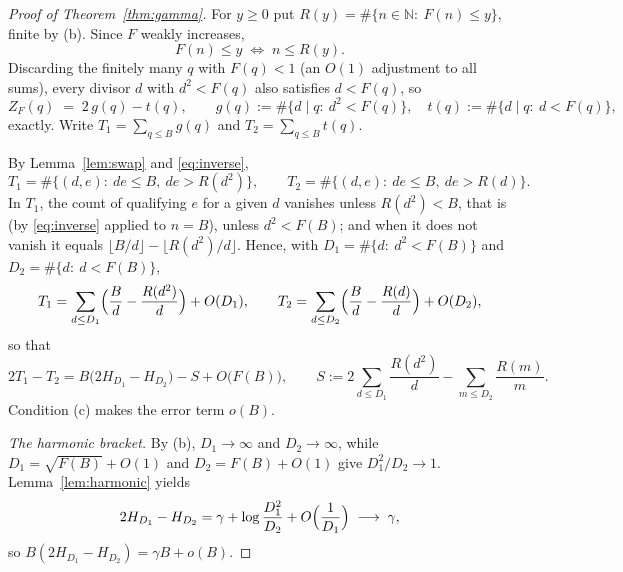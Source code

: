 \documentclass[11pt]{amsart}
\theoremstyle{remark}
\newcommand{\N}{\mathbb{N}}
\newcommand{\eul}{\gamma}
\begin{document}
\begin{proof}[Proof of Theorem~\ref{thm:gamma}]
For $y\ge0$ put $R(y)=\#\{n\in\N:\ F(n)\le y\}$, finite by (b).  Since
$F$ weakly increases,
\begin{equation}\label{eq:inverse}
F(n)\le y\;\iff\;n\le R(y).
\end{equation}
Discarding the finitely many $q$ with $F(q)<1$ (an $O(1)$ adjustment to
all sums), every divisor $d$ with $d^{2}<F(q)$ also satisfies
$d<F(q)$, so
\[
Z_{F}(q)\;=\;2\,g(q)-t(q),
\qquad
g(q):=\#\{d\mid q:\ d^{2}<F(q)\},
\quad
t(q):=\#\{d\mid q:\ d<F(q)\},
\]
exactly.  Write $T_{1}=\sum_{q\le B}g(q)$ and
$T_{2}=\sum_{q\le B}t(q)$.

By Lemma~\ref{lem:swap} and \eqref{eq:inverse},
\[
T_{1}=\#\{(d,e):\ de\le B,\ de>R(d^{2})\},
\qquad
T_{2}=\#\{(d,e):\ de\le B,\ de>R(d)\}.
\]
In $T_{1}$, the count of qualifying $e$ for a given $d$ vanishes unless
$R(d^{2})<B$, that is (by \eqref{eq:inverse} applied to $n=B$), unless
$d^{2}<F(B)$; and when it does not vanish it equals
$\lfloor B/d\rfloor-\lfloor R(d^{2})/d\rfloor$.  Hence, with
$D_{1}=\#\{d:\ d^{2}<F(B)\}$ and $D_{2}=\#\{d:\ d<F(B)\}$,
\[
T_{1}=\sum_{d\le D_{1}}\Bigl(\frac{B}{d}-\frac{R(d^{2})}{d}\Bigr)
+O(D_{1}),
\qquad
T_{2}=\sum_{d\le D_{2}}\Bigl(\frac{B}{d}-\frac{R(d)}{d}\Bigr)
+O(D_{2}),
\]
so that
\begin{equation}\label{eq:master}
2T_{1}-T_{2}
=B\bigl(2H_{D_{1}}-H_{D_{2}}\bigr)-S+O\bigl(F(B)\bigr),
\qquad
S:=2\sum_{d\le D_{1}}\frac{R(d^{2})}{d}
-\sum_{m\le D_{2}}\frac{R(m)}{m}.
\end{equation}
Condition (c) makes the error term $o(B)$.

\smallskip
\emph{The harmonic bracket.}
By (b), $D_{1}\to\infty$ and $D_{2}\to\infty$, while
$D_{1}=\sqrt{F(B)}+O(1)$ and $D_{2}=F(B)+O(1)$ give
$D_{1}^{2}/D_{2}\to1$.  Lemma~\ref{lem:harmonic} yields
\[
2H_{D_{1}}-H_{D_{2}}
=\eul+\log\frac{D_{1}^{2}}{D_{2}}+O\Bigl(\frac1{D_{1}}\Bigr)
\;\longrightarrow\;\eul,
\]
so $B(2H_{D_{1}}-H_{D_{2}})=\eul B+o(B)$.


\end{proof}
\end{document}
